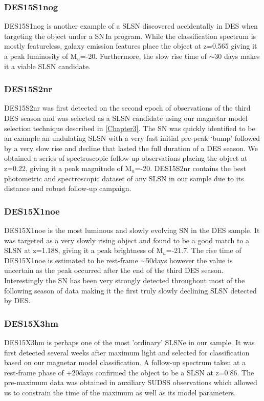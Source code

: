 \subsubsection{DES15S1nog}
DES15S1nog is another example of a SLSN discovered accidentally in DES when targeting the object under a SN\,Ia program. While the classification spectrum is mostly featureless, galaxy emission features place the object at z=0.565 giving it a peak luminosity of M$_u$=-20. Furthermore, the slow rise time of $\sim$30 days makes it a viable SLSN candidate.

\subsubsection{DES15S2nr}
DES15S2nr was first detected on the second epoch of observations of the third DES season and was selected as a SLSN candidate using our magnetar model selection technique described in \cref{Chapter3}. The SN was quickly identified to be an example an undulating SLSN with a very fast initial pre-peak `bump' followed by a very slow rise and decline that lasted the full duration of a DES season. We obtained a series of spectroscopic follow-up observations placing the object at z=0.22, giving it a peak magnitude of M$_u$=-20. DES15S2nr contains the best photometric and spectroscopic dataset of any SLSN in our sample due to its distance and robust follow-up campaign.

\subsubsection{DES15X1noe}
DES15X1noe is the most luminous and slowly evolving SN in the DES sample. It was targeted as a very slowly rising object and found to be a good match to a SLSN at z=1.188, giving it a peak brightness of M$_u$=-21.7. The rise time of DES15X1noe is estimated to be rest-frame $\sim$50days however the value is uncertain as the peak occurred after the end of the third DES season. Interestingly the SN has been very strongly detected throughout most of the following season of data making it the first truly slowly declining SLSN detected by DES.

\subsubsection{DES15X3hm}
DES15X3hm is perhaps one of the most 'ordinary' SLSNe in our sample. It was first detected several weeks after maximum light and selected for classification based on our magnetar model classification. A follow-up spectrum taken at a rest-frame phase of +20days confirmed the object to be a SLSN at z=0.86. The pre-maximum data was obtained in auxiliary SUDSS observations which allowed us to constrain the time of the maximum as well as its model parameters.

